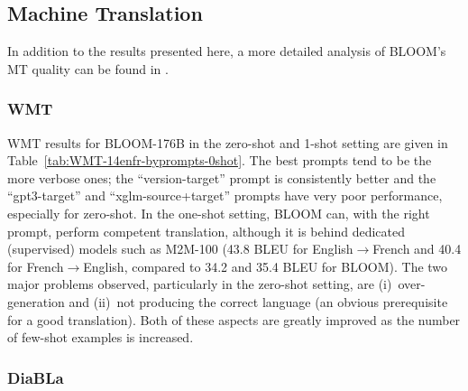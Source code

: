 \documentclass[twoside,11pt]{article}
\begin{document}
\subsection{Machine Translation}
\label{sec:eval:mt}

In addition to the results presented here, a more detailed analysis of BLOOM's MT quality can be found in \citep{bawden-yvon-2023-mt-bloom}.

\subsubsection{WMT}
\label{sec:eval:mt:wmt}

WMT results for BLOOM-176B in the zero-shot and 1-shot setting are given in Table~\ref{tab:WMT-14enfr-byprompts-0shot}.
The best prompts tend to be the more verbose ones; the ``version-target'' prompt is consistently better and the ``gpt3-target'' and ``xglm-source+target'' prompts have very poor performance, especially for zero-shot. In the one-shot setting, BLOOM can, with the right prompt, perform competent translation, although it is behind dedicated (supervised) models such as M2M-100 (43.8 BLEU for English$\rightarrow$French and 40.4 for French$\rightarrow$English, compared to 34.2 and 35.4 BLEU for BLOOM).
The two major problems observed, particularly in the zero-shot setting, are (i)~over-generation and (ii)~not producing the correct language (an obvious prerequisite for a good translation). Both of these aspects are greatly improved as the number of few-shot examples is increased. %

%


\subsubsection{DiaBLa}

%

\end{document}

